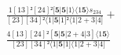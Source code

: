 \documentclass[varwidth, border=5pt]{standalone}
\begin{document}
\begin{my}
$\begin{gathered}
\scriptscriptstyle\frac{1[13]²[24]²[𝟓|𝟓|1⟩⟨1𝟓⟩s_{234}}{[23][34]²⟨1|𝟓|1]²⟨1|2+3|4]} +\\
\scriptscriptstyle\frac{4[13][24]²[𝟓|𝟓|2+4|3]⟨1𝟓⟩}{[23][34]²⟨1|𝟓|1]⟨1|2+3|4]} \phantom{+}
\end{gathered}$
\end{my}
\end{document}
